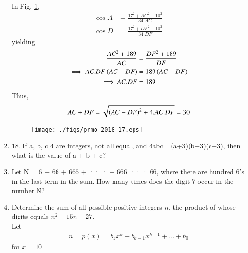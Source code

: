 \documentclass[journal,12pt,twocolumn]{IEEEtran}
\begin{document}
\begin{enumerate}[label=\arabic*]
\\
\solution In Fig. \ref{fig:prmo_2018_17},
\begin{align}
\cos A &= \frac{17^2+AC^2-10^2}{34.AC}  
\\
\cos D &= \frac{17^2+DF^2-10^2}{34.DF}  
\end{align}
yielding
\begin{align}
 \frac{AC^2+189}{AC}   &= \frac{DF^2+189}{DF}  
\\
\implies AC.DF\left(AC-DF\right) &= 189\left(AC-DF\right)
\\
\implies AC.DF &= 189
\end{align}
%
Thus, 
\begin{align}
AC+DF = \sqrt{\left(AC-DF\right)^2+4.AC.DF} = 30
\end{align}

\begin{figure}[!ht]
\centering
\texttt{[image: ./figs/prmo\_2018\_17.eps]}
\caption{}
\label{fig:prmo_2018_17}
\end{figure}
\item 18. If a, b, c 
 4 are integers, not all equal, and 4abc =(a+3)(b+3)(c+3), then what is the value of a + b + c? 
\item  Let N = 6 + 66 + 666 + ·· · + 666 ·· · 66, where there are hundred 6’s in the last term in the sum. How many times does the digit 7 occur in the number N? 
\item  Determine the sum of all possible positive integers $n$, the product of whose digits equals $ n^2-15n-27$. 
\\
\solution Let 
\begin{align}
n = p(x) = b_kx^k+b_{k-1}x^{k-1}+\dots + b_0
\end{align}
for $x = 10$


\end{enumerate}
\end{document}
